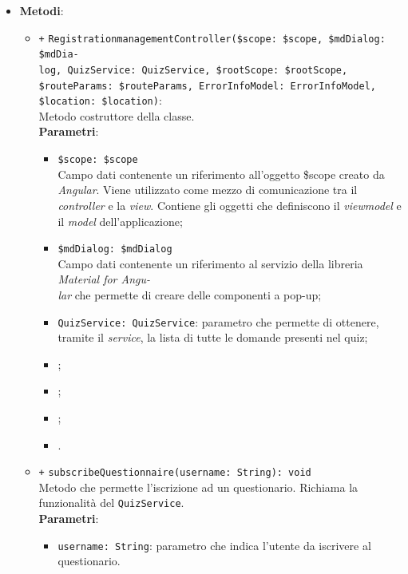 \begin{itemize}
\begin{itemize}
	\end{itemize}
	\item \textbf{Metodi}:
	\begin{itemize}
		\item \texttt{+} \texttt{RegistrationmanagementController(\$scope: \$scope, \$mdDialog: \$mdDia-\\log, QuizService: QuizService, \$rootScope: \$rootScope, \$routeParams: \$routeParams, ErrorInfoModel: ErrorInfoModel, \$location: \$location)}: \\Metodo costruttore della classe. \\
			\textbf{Parametri}:
			\begin{itemize}
					\item \texttt{\$scope: \$scope} \\
					Campo dati contenente un riferimento all'oggetto \$scope creato da \textit{Angular}. Viene utilizzato come mezzo di comunicazione tra il \textit{controller\ped{G}} e la \textit{view}. Contiene gli oggetti che definiscono il \textit{viewmodel\ped{G}} e il \textit{model} dell'applicazione;
					\item \texttt{\$mdDialog: \$mdDialog} \\
					Campo dati contenente un riferimento al servizio della libreria \textit{Material for Angu-\\lar{}} che permette di creare delle componenti a pop-up;
					\item \texttt{QuizService: QuizService}: parametro che permette di ottenere, tramite il \textit{service}, la lista di tutte le domande presenti nel quiz;
					\item \rootscopeP;
					\item \routeparamsP;
					\item \errorinfomodelP;
					\item \locationP. 
			\end{itemize}
		\item \texttt{+} \texttt{subscribeQuestionnaire(username: String): void} \\ Metodo che permette l'iscrizione ad un questionario. Richiama la funzionalità del \texttt{QuizService}. \\
		\textbf{Parametri}:
		\begin{itemize}
			\item \texttt{username: String}: parametro che indica l'utente da iscrivere al questionario.
		\end{itemize}
		

\end{itemize}
\end{itemize}
